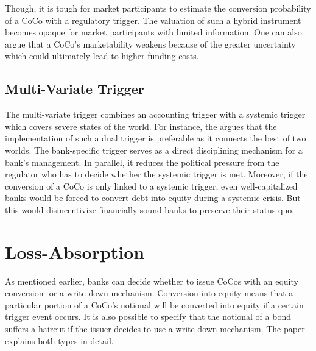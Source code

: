 Though, it is tough for market participants to estimate the conversion probability of a CoCo with a regulatory trigger. The valuation of such a hybrid instrument becomes opaque for market participants with limited information. \citep{alvemar2012modelling} One can also argue that a CoCo's marketability weakens because of the greater uncertainty which could ultimately lead to higher funding costs. \citep{de2014handbook} 

\subsection{Multi-Variate Trigger} \label{multivariatetrigger}

The multi-variate trigger combines an accounting trigger with a systemic trigger which covers severe states of the world. For instance, the \citet{squam2009expedited} argues that the implementation of such a dual trigger is preferable as it connects the best of two worlds. The bank-specific trigger serves as a direct disciplining mechanism for a bank's management. In parallel, it reduces the political pressure from the regulator who has to decide whether the systemic trigger is met. Moreover, if the conversion of a CoCo is only linked to a systemic trigger, even well-capitalized banks would be forced to convert debt into equity during a systemic crisis. But this would disincentivize financially sound banks to preserve their status quo.


\section{Loss-Absorption} \label{lossabsorption}

As mentioned earlier, banks can decide whether to issue CoCos with an equity conversion- or a write-down mechanism. Conversion into equity means that a particular portion of a CoCo's notional will be converted into equity if a certain trigger event occurs. It is also possible to specify that the notional of a bond suffers a haircut if the issuer decides to use a write-down mechanism. The paper explains both types in detail.

